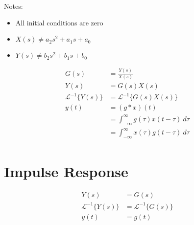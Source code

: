\documentclass{article}
\begin{document}
    Notes: \begin{itemize}
        \item All initial conditions are zero
        \item $X(s) \neq a_2s^2 + a_1s + a_0$
        \item $Y(s) \neq b_2s^2 + b_1s + b_0$
    \end{itemize}

    $$\begin{aligned}
        G(s) &= \frac{Y(s)}{X(s)} \\
        Y(s) &= G(s)X(s) \\
        \mathscr{L}^{-1}\{Y(s)\} &= \mathscr{L}^{-1}\{G(s)X(s)\} \\
        y(t) &= (g * x)(t) \\
        &= \int_{-\infty}^\infty{g(\tau)x(t - \tau)\ d\tau} \\
        &= \int_{-\infty}^\infty{x(\tau)g(t - \tau)\ d\tau} \\
    \end{aligned}$$

    \section{Impulse Response}

    $$\begin{aligned}
        Y(s) &= G(s) \\
        \mathscr{L}^{-1}\{Y(s)\} &= \mathscr{L}^{-1}\{G(s)\} \\
        y(t) &= g(t)
    \end{aligned}$$
\end{document}
